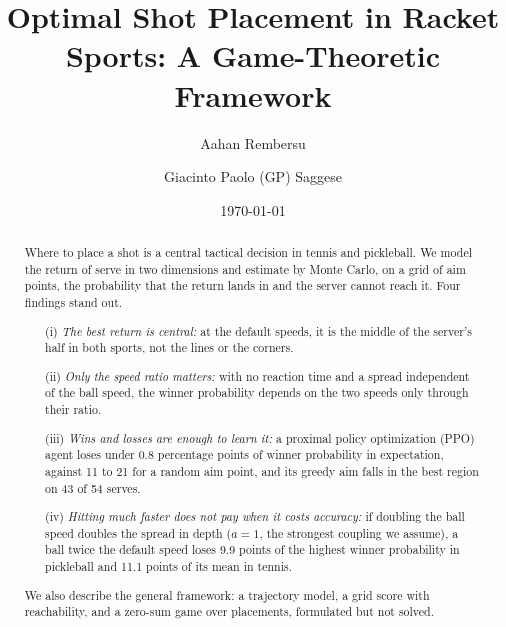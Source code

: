   \title{Optimal Shot Placement in Racket Sports: A Game-Theoretic Framework}

  \author{Aahan Rembersu}
  \address{Department of Computer Science, University of Maryland, College
    Park, College Park, MD, USA}

  \author{Giacinto Paolo (GP) Saggese}
  \address{Department of Computer Science, University of Maryland, College
    Park, College Park, MD, USA}


  \date{\today}

  \begin{abstract}
    Where to place a shot is a central tactical decision in tennis and
    pickleball. We model the return of serve in two dimensions and estimate by
    Monte Carlo, on a grid of aim points, the probability that the return lands
    in and the server cannot reach it. Four findings stand out.
    \begin{itemize}
      \item[(i)] \emph{The best return is central:} at the default speeds, it
      is the middle of the server's half in both sports, not the lines or the
      corners.

      \item[(ii)] \emph{Only the speed ratio matters:} with no reaction time and
      a spread independent of the ball speed, the winner probability depends on
      the two speeds only through their ratio.

      \item[(iii)] \emph{Wins and losses are enough to learn it:} a proximal
      policy optimization (PPO) agent loses under 0.8 percentage points of
      winner probability in expectation, against 11 to 21 for a random aim
      point, and its greedy aim falls in the best region on 43 of 54 serves.

      \item[(iv)] \emph{Hitting much faster does not pay when it costs
      accuracy:} if doubling the ball speed doubles the spread in depth ($a =
      1$, the strongest coupling we assume), a ball twice the default speed
      loses 9.9 points of the highest winner probability in pickleball and 11.1
      points of its mean in tennis.
    \end{itemize}
    We also describe the general framework: a trajectory model, a grid score
    with reachability, and a zero-sum game over placements, formulated but not
    solved.
  \end{abstract}

